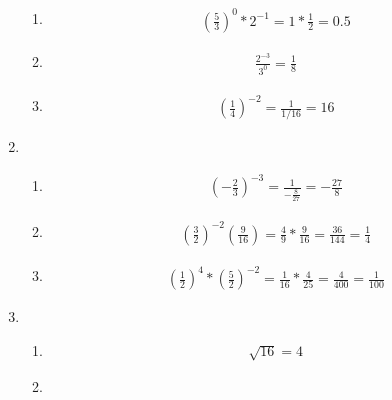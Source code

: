 \documentclass{article}
\begin{document}
\begin{enumerate}
	      \begin{enumerate}
		      \item
		            \begin{align*}
			            \left(\frac{5}{3}\right)^0*2^{-1}
			            = 1*\frac{1}{2}
			            = 0.5
		            \end{align*}
		      \item
		            \begin{align*}
			            \frac{2^{-3}}{3^0}
			            = \frac{1}{8}
		            \end{align*}
		      \item
		            \begin{align*}
			            \left(\frac{1}{4}\right)^{-2}
			            = \frac{1}{1/16}
			            = 16
		            \end{align*}
	      \end{enumerate}
	\item
	      \begin{enumerate}
		      \item
		            \begin{align*}
			            \left(-\frac{2}{3}\right)^{-3}
			            = \frac{1}{-\frac{8}{27}}
			            = -\frac{27}{8}
		            \end{align*}
		      \item
		            \begin{align*}
			            \left(\frac{3}{2}\right)^{-2}\left(\frac{9}{16}\right)
			            = \frac{4}{9}*\frac{9}{16}
			            = \frac{36}{144}
			            = \frac{1}{4}
		            \end{align*}
		      \item
		            \begin{align*}
			            \left(\frac{1}{2}\right)^4*\left(\frac{5}{2}\right)^{-2}
			            = \frac{1}{16}*\frac{4}{25}
			            = \frac{4}{400} = \frac{1}{100}
		            \end{align*}
	      \end{enumerate}
	\item
	      \begin{enumerate}
		      \item
		            \begin{align*}
			            \sqrt{16}
			            = 4
		            \end{align*}
		      \item
		            \begin{align*}

\end{align*}
\end{enumerate}
\end{enumerate}
\end{document}
